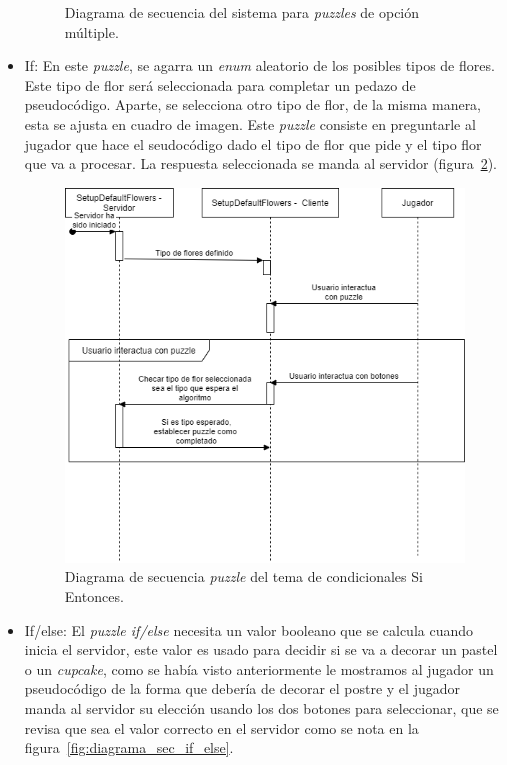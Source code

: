 \begin{itemize}
\begin{figure}[H]
        \caption{Diagrama de secuencia del sistema para \textit{puzzles} de opción múltiple.}
        \label{fig:diagrama_sec_opmul}
    \end{figure}
    \item If: En este \textit{puzzle}, se agarra un \textit{enum} aleatorio de los posibles tipos de flores. Este tipo de flor será seleccionada para completar un pedazo de pseudocódigo. Aparte, se selecciona otro tipo de flor, de la misma manera, esta se ajusta en cuadro de imagen. Este \textit{puzzle} consiste en preguntarle al jugador que hace el seudocódigo dado el tipo de flor que pide y el tipo flor que va a procesar. La respuesta seleccionada se manda al servidor (figura~\ref{fig:diagrama_sec_if}).
    \begin{figure}[H]
        \centering
        \includegraphics[width=0.8\linewidth]{images/DiagramaSecuenciaPuzzleIf.png}
        \caption{Diagrama de secuencia \textit{puzzle} del tema de condicionales Si Entonces.}
        \label{fig:diagrama_sec_if}
    \end{figure}
    \item If/else: El \textit{puzzle if/else} necesita un valor booleano que se calcula cuando inicia el servidor, este valor es usado para decidir si se va a decorar un pastel o un \textit{cupcake}, como se había visto anteriormente le mostramos al jugador un pseudocódigo de la forma que debería de decorar el postre y el jugador manda al servidor su elección usando los dos botones para seleccionar, que se revisa que sea el valor correcto en el servidor como se nota en la figura~\ref{fig:diagrama_sec_if_else}.
    \begin{figure}[H]

\end{figure}
\end{itemize}
